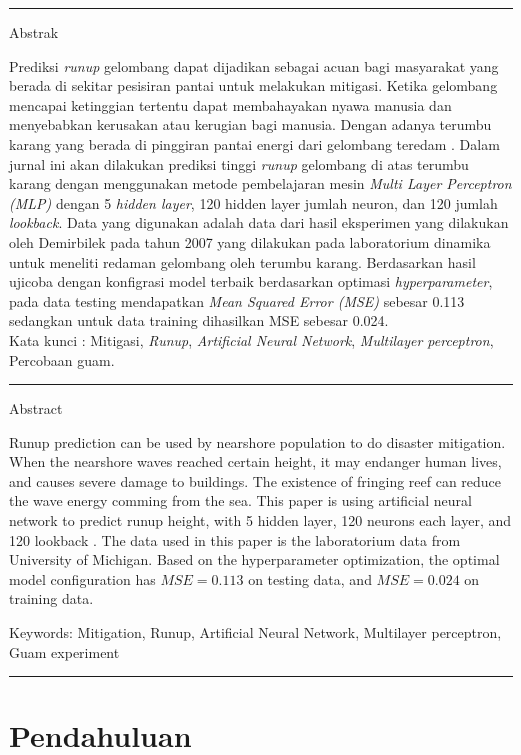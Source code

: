 {\bf \parindent0pt \noindent\rule{\textwidth}{1pt}
Abstrak

Prediksi \emph{runup} gelombang dapat dijadikan sebagai acuan bagi masyarakat yang berada di sekitar pesisiran pantai untuk melakukan mitigasi. Ketika gelombang mencapai ketinggian tertentu dapat membahayakan nyawa manusia dan menyebabkan kerusakan atau kerugian bagi manusia. Dengan adanya terumbu karang yang berada di pinggiran pantai energi dari gelombang teredam . Dalam jurnal ini akan dilakukan prediksi tinggi \emph{runup} gelombang di atas terumbu karang dengan menggunakan metode pembelajaran mesin \emph{Multi Layer Perceptron (MLP)} dengan 5 \emph{hidden layer}, 120 hidden layer jumlah neuron, dan 120 jumlah \emph{lookback}. Data yang digunakan adalah data dari hasil eksperimen yang dilakukan oleh Demirbilek pada tahun 2007 yang dilakukan pada laboratorium dinamika untuk meneliti redaman gelombang oleh terumbu karang. Berdasarkan hasil ujicoba dengan konfigrasi model terbaik berdasarkan optimasi \emph{hyperparameter}, pada data testing mendapatkan \emph{Mean Squared Error (MSE)} sebesar 0.113 sedangkan untuk data training dihasilkan MSE sebesar 0.024.\\

Kata kunci : Mitigasi, \emph{Runup}, \emph{Artificial Neural Network}, \emph{Multilayer perceptron}, Percobaan guam.


\noindent\rule{\textwidth}{1pt}
Abstract

Runup prediction can be used by nearshore population to do disaster mitigation. When the nearshore waves reached certain height, it may endanger human lives, and causes severe damage to buildings. The existence of fringing reef can reduce the wave energy comming from the sea. This paper is using artificial neural network to predict runup height, with 5 hidden layer, 120 neurons each layer, and 120 lookback . The data used in this paper is the laboratorium data from University of Michigan. Based on the hyperparameter optimization, the optimal model configuration has $MSE=0.113$ on testing data, and $MSE=0.024$ on training data.

 \bigskip
Keywords: Mitigation, Runup, Artificial Neural Network, Multilayer perceptron, Guam experiment

\noindent\rule{\textwidth}{1pt} }


\section{Pendahuluan}



